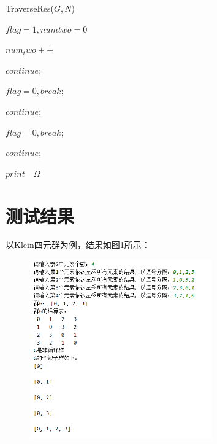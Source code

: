 \documentclass[11pt, a4paper, oneside，UTF8]{article}
\begin{document}
\begin{algorithm}
	\caption{TraverseRes($G,N$)}
	\begin{algorithmic}[1]
			\STATE $flag=1,numtwo=0$

					\STATE $num_two++$
				\ENDIF
			\ENDFOR

				\STATE $continue;$
			\ENDIF
			
					\STATE $flag=0,break;$
				\ENDIF
			\ENDFOR
			
				\STATE $continue;$			
			\ENDIF

					\STATE $flag=0, break;$
				\ENDIF
			\ENDFOR

				\STATE $continue;$			
			\ENDIF

			\STATE $print\quad \Omega$
		\ENDFOR
	\end{algorithmic}
\end{algorithm}




\section{测试结果}
以Klein四元群为例，结果如图1所示：


\begin{figure}[H] %
\centering %
\includegraphics[width=0.7\textwidth]{picture1} %
\caption{} %
\label{} %
\end{figure}
\end{document}

